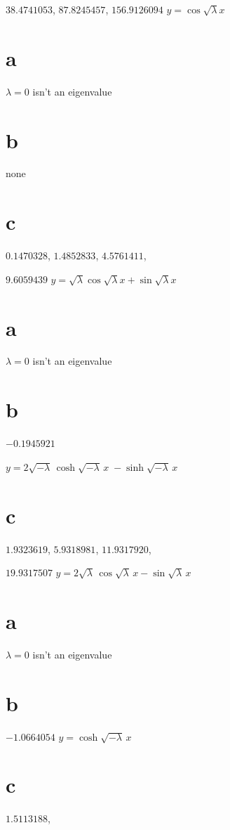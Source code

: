 \quad \quad
$38.4741053$,  $87.8245457$, $156.9126094$
$y=\cos\sqrt{\lambda}x$

\smallskip

 \part{a} $\lambda=0$ isn't  an eigenvalue\;    \part{b} none\;
\part{c} $0.
1470328$, $1.4852833$, $4.5761411$,

\quad \quad
$9.6059439  $\;
$y=\sqrt{\lambda}\cos\sqrt{\lambda}x+\sin\sqrt{\lambda}x$

\smallskip

 \part{a} $\lambda=0$ isn't  an eigenvalue\;   \part{b} $-0.1945921$

\quad \quad
$y=2\sqrt{-\lambda}\,\cosh\sqrt{-\lambda}\,x\;
-\sinh\sqrt{-\lambda}\,x$
\part{c} $1.9323619$, $5.9318981$, $11.9317920$,

\quad \quad  $19.9317507$
$y=2\sqrt{\lambda}\,\cos\sqrt{\lambda}\,x-\sin\sqrt{\lambda}\,x$

\smallskip

 \part{a} $\lambda=0$ isn't  an eigenvalue\;
 \part{b} $-1.0664054$   $y=\cosh\sqrt{-\lambda}\,x$\;
\part{c} $1.5113188$,

